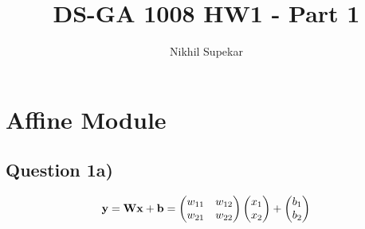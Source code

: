 \documentclass{article}
\title{DS-GA 1008 HW1 - Part 1}
\author{Nikhil Supekar}
\begin{document}
\maketitle

\section{Affine Module}

\subsection{Question 1a)}


\begin{align*}
\textbf{\textbf{y}}= \textbf{W} \textbf{x} + \textbf{\textbf{b}} = \begin{pmatrix}{w_{11}} & {w_{12}} \\ {w_{21}} & {w_{22}}\end{pmatrix}\begin{pmatrix}{x_{1}} \\ {x_{2}}\end{pmatrix}+\begin{pmatrix}{b_{1}} \\ {b_{2}}\end{pmatrix}
\end{align*}
\end{document}
